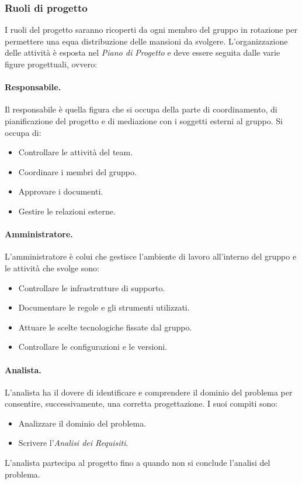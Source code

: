 \subsubsection{Ruoli di progetto}
I ruoli del progetto saranno ricoperti da ogni membro del gruppo in rotazione per permettere
una equa distribuzione delle mansioni da svolgere. L'organizzazione delle attività
è esposta nel \emph{Piano di Progetto} e deve essere seguita dalle varie figure progettuali, ovvero:

\paragraph{Responsabile.}
Il responsabile è quella figura che si occupa della parte di coordinamento, di pianificazione del progetto 
e di mediazione con i soggetti esterni al gruppo. Si occupa di:
\begin{itemize}
    \item Controllare le attività del team.
    \item Coordinare i membri del gruppo.
    \item Approvare i documenti.
    \item Gestire le relazioni esterne.
\end{itemize}

\paragraph{Amministratore.}
L'amministratore è colui che gestisce l'ambiente di lavoro all'interno del gruppo e le attività che svolge sono:
\begin{itemize}
    \item Controllare le infrastrutture di supporto.
    \item Documentare le regole e gli strumenti utilizzati.
    \item Attuare le scelte tecnologiche fissate dal gruppo.
    \item Controllare le configurazioni e le versioni.
\end{itemize}

\paragraph{Analista.}
L'analista ha il dovere di identificare e comprendere il dominio del problema per consentire, successivamente,
una corretta progettazione. I suoi compiti sono:
\begin{itemize}
    \item Analizzare il dominio del problema.
    \item Scrivere l'\emph{Analisi dei Requisiti}.
\end{itemize}
L'analista partecipa al progetto fino a quando non si conclude l'analisi del problema.

